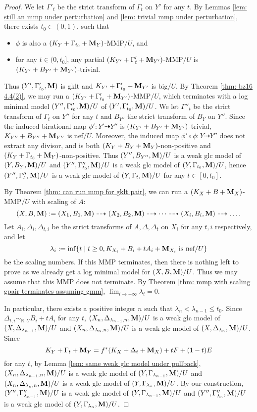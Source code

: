 \documentclass[11pt]{amsart}
\numberwithin{equation}{section}
\newcommand{\Mm}{{\bf{M}}}
\theoremstyle{definition}
\theoremstyle{definition}
\theoremstyle{definition}
\begin{document}
\begin{proof}
We let $\Gamma'_t$ be the strict transform of $\Gamma_t$ on $Y'$ for any $t$. By Lemmas \ref{lem: still an mmp under perturbation} and \ref{lem: trivial mmp under perturbation}, there exists $t_0\in (0,1)$, such that 
\begin{itemize}
    \item $\phi$ is also a $(K_Y+\Gamma_{t_0}+\Mm_Y)$-MMP$/U$, and
    \item for any $t\in (0,t_0]$, any partial $(K_{Y'}+\Gamma'_{t}+\Mm_{Y'})$-MMP$/U$ is $(K_{Y'}+B_{Y'}+\Mm_{Y'})$-trivial.
\end{itemize}
Thus $(Y',\Gamma_{t_0}',\Mm)$ is gklt and $K_{Y'}+\Gamma'_{t_0}+\Mm_{Y'}$ is big$/U$. By Theorem \ref{thm: bz16 4.4(2)}, we may run a $(K_{Y'}+\Gamma'_{t_0}+\Mm_{Y'})$-MMP$/U$, which terminates with a log minimal model $(Y'',\Gamma''_{t_0},\Mm)/U$ of $(Y',\Gamma'_{t_0},\Mm)/U$. We let $\Gamma''_t$ be the strict transform of $\Gamma_t$ on $Y''$ for any $t$ and $B_{Y''}$ the strict transform of $B_Y$ on $Y''$. Since the induced birational map $\phi': Y'\dashrightarrow Y''$ is $(K_{Y'}+B_{Y'}+\Mm_{Y'})$-trivial, $K_{Y''}+B_{Y''}+\Mm_{Y''}$ is nef$/U$. Moreover, the induced map $\phi'\circ\phi: Y\dashrightarrow Y''$ does not extract any divisor, and is both $(K_Y+B_Y+\Mm_Y)$-non-positive and $(K_Y+\Gamma_{t_0}+\Mm_Y)$-non-positive. Thus $(Y'',B_{Y''},\Mm)/U$ is a weak glc model of $(Y,B_Y,\Mm)/U$ and $(Y'',\Gamma''_{t_0},\Mm)/U$ is a weak glc model of $(Y,\Gamma_{t_0},\Mm)/U$, hence $(Y'',\Gamma''_t,\Mm)/U$ is a weak glc model of $(Y,\Gamma_t,\Mm)/U$ for any $t\in [0,t_0]$.


By Theorem \ref{thm: can run mmp for gklt pair}, we can run a $(K_X+B+\Mm_X)$-MMP$/U$ with scaling of $A$:
$$(X,B,\Mm):=(X_1,B_1,\Mm)\dashrightarrow (X_2,B_2,\Mm)\dashrightarrow\dots\dashrightarrow (X_i,B_i,\Mm)\dashrightarrow\dots.$$
Let $A_i,\Delta_i,\Delta_{t,i}$ be the strict transforms of $A,\Delta,\Delta_t$ on $X_i$ for any $t,i$ respectively, and let
$$\lambda_i:=\inf\{t\mid t\geq 0, K_{X_i}+B_i+tA_i+\Mm_{X_i}\text{ is nef/}U\}$$
be the scaling numbers. If this MMP terminates, then there is nothing left to prove as we already get a log minimal model for $(X,B,\Mm)/U$. Thus we may assume that this MMP does not terminate. By Theorem \ref{thm: mmp with scaling gpair terminates assuming gmm}, $\lim_{i\rightarrow+\infty}\lambda_i=0$. 

In particular, there exists a positive integer $n$ such that $\lambda_n<\lambda_{n-1}\leq t_0$. Since $\Delta_{t,i}\sim_{\mathbb R,U}B_i+tA_i$ for any $t$, $(X_n,\Delta_{\lambda_{n-1},n},\Mm)/U$ is a weak glc model of $(X,\Delta_{\lambda_{n-1}},\Mm)/U$ and $(X_n,\Delta_{\lambda_{n},n},\Mm)/U$ is a weak glc model of $(X,\Delta_{\lambda_{n}},\Mm)/U$. Since
$$K_Y+\Gamma_t+\Mm_Y=f^*(K_X+\Delta_t+\Mm_X)+tF+(1-t)E$$
for any $t$, by Lemma \ref{lem: same weak glc model under pullback}, $(X_n,\Delta_{\lambda_{n-1},n},\Mm)/U$ is a weak glc model of $(Y,\Gamma_{\lambda_{n-1}},\Mm)/U$ and $(X_n,\Delta_{\lambda_{n},n},\Mm)/U$ is a weak glc model of $(Y,\Gamma_{\lambda_{n}},\Mm)/U$. By our construction, $(Y'',\Gamma''_{\lambda_{n-1}},\Mm)/U$ is a weak glc model of $(Y,\Gamma_{\lambda_{n-1}},\Mm)/U$ and $(Y'',\Gamma''_{\lambda_{n}},\Mm)/U$ is a weak glc model of $(Y,\Gamma_{\lambda_{n}},\Mm)/U$.


\end{proof}
\end{document}
